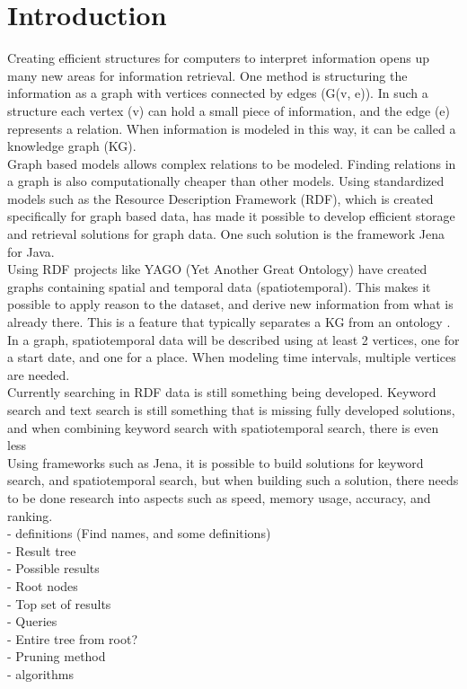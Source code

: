 
\chapter{Introduction}
Creating efficient structures for computers to interpret information opens up many new areas for information retrieval. One method is structuring the information as a graph with vertices connected by edges (G(v, e)). In such a structure each vertex (v) can hold a small piece of information, and the edge (e) represents a relation. When information is modeled in this way, it can be called a knowledge graph (KG).\\

Graph based models allows complex relations to be modeled. Finding relations in a graph is also computationally cheaper than other models. Using standardized models such as the Resource Description Framework (RDF), which is created specifically for graph based data, has made it possible to develop efficient storage and retrieval solutions for graph data. One such solution is the framework Jena \cite{jena2} for Java.\\

Using RDF projects like YAGO (Yet Another Great Ontology) \cite{yago} have created graphs containing spatial and temporal data (spatiotemporal). This makes it possible to apply reason to the dataset, and derive new information from what is already there. This is a feature that typically separates a KG from an ontology \cite{KGDefYago}. In a graph, spatiotemporal data will be described using at least 2 vertices, one for a start date, and one for a place. When modeling time intervals, multiple vertices are needed.\\

Currently searching in RDF data is still something being developed. Keyword search and text search is still something that is missing fully developed solutions, and when combining keyword search with spatiotemporal search, there is even less %
\\
Using frameworks such as Jena, it is possible to build solutions for keyword search, and spatiotemporal search, but when building such a solution, there needs to be done research into aspects such as speed, memory usage, accuracy, and ranking.\\

- definitions (Find names, and some definitions)\\
- Result tree\\
- Possible results\\
- Root nodes\\
- Top set of results\\
- Queries\\
- Entire tree from root?\\
- Pruning method\\
- algorithms\\

